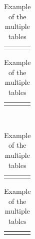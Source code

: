 \documentclass[dvipdfmx,conference,a4paper,nofonttune]{APSIPA}
\begin{document}
\begin{table}[t]
   \centering
   \caption{Example of the multiple tables}
   \begin{minipage}{.45\hsize}
      \centering
      \begin{tabular}{|c|c|c|}
      \hline
       & & \\
      \hline
       & & \\
      \hline
      \end{tabular}
   \end{minipage}
   \begin{minipage}{.45\hsize}
      \centering
      \begin{tabular}{|c|c|c|}
      \hline
       & & \\
      \hline
       & & \\
      \hline
      \end{tabular}
   \end{minipage} \\[1.5em]
   \begin{minipage}{.45\hsize}
      \centering
      \begin{tabular}{|c|c|c|}
      \hline
       & & \\
      \hline
       & & \\
      \hline
      \end{tabular}
   \end{minipage}
   \begin{minipage}{.45\hsize}
      \centering
      \begin{tabular}{|c|c|c|}
      \hline
       & & \\
      \hline
       & & \\
      \hline
      \end{tabular}
   \end{minipage}
\end{table}
\end{document}
